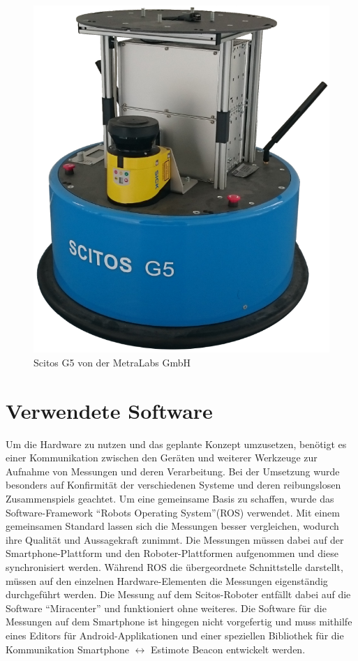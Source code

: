\begin{figure}[H] 
\centering
\includegraphics[scale=0.2]{Bilder/Scitos}
\caption{Scitos G5 von der MetraLabs GmbH}
\label{fig:Scitos}
\end{figure}
\section{Verwendete Software}
Um die Hardware zu nutzen und das geplante Konzept umzusetzen, benötigt es einer Kommunikation zwischen den Geräten und weiterer Werkzeuge zur Aufnahme von Messungen und deren Verarbeitung. Bei der Umsetzung wurde besonders auf Konfirmität der verschiedenen Systeme und deren reibungslosen Zusammenspiels geachtet. Um eine gemeinsame Basis zu schaffen, wurde das Software-Framework "`Robots Operating System"'(ROS) verwendet. Mit einem gemeinsamen Standard lassen sich die Messungen besser vergleichen, wodurch ihre Qualität und Aussagekraft zunimmt. Die Messungen müssen dabei auf der Smartphone-Plattform und den Roboter-Plattformen aufgenommen und  diese synchronisiert werden. Während ROS die übergeordnete Schnittstelle darstellt, müssen auf den einzelnen Hardware-Elementen die Messungen eigenständig durchgeführt werden. Die Messung auf dem Scitos-Roboter entfällt dabei auf die Software "`Miracenter"' und funktioniert ohne weiteres. Die Software für die Messungen auf dem Smartphone ist hingegen nicht vorgefertig und muss mithilfe eines Editors für Android-Applikationen und einer speziellen Bibliothek für die Kommunikation Smartphone $\leftrightarrow$ Estimote Beacon entwickelt werden.

